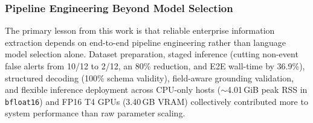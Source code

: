 \documentclass[11pt,a4paper]{article}
\begin{document}
\subsubsection{Pipeline Engineering Beyond Model Selection}
The primary lesson from this work is that reliable enterprise information extraction depends on end-to-end pipeline engineering rather than language model selection alone. Dataset preparation, staged inference (cutting non-event false alerts from 10/12 to 2/12, an 80\% reduction, and E2E wall-time by 36.9\%), structured decoding (100\% schema validity), field-aware grounding validation, and flexible inference deployment across CPU-only hosts ($\sim$4.01\,GiB peak RSS in \texttt{bfloat16}) and FP16 T4 GPUs (3.40\,GB VRAM) collectively contributed more to system performance than raw parameter scaling.
\end{document}
